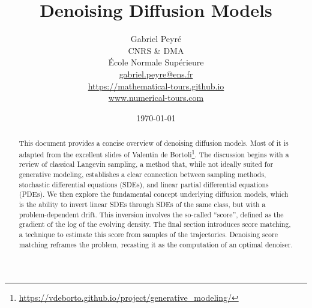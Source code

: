 \documentclass[10pt]{article}
\title{Denoising Diffusion Models}
\author{%
\begin{tabular}{c}
	Gabriel Peyr{\'e} \\ CNRS \& DMA \\
	 \'Ecole Normale Sup\'erieure \\
	 \url{gabriel.peyre@ens.fr}\\
	 \url{https://mathematical-tours.github.io}\\
	 \url{www.numerical-tours.com}
\end{tabular}
}
\date{\today}
\begin{document}
\maketitle

\begin{abstract}
This document provides a concise overview of denoising diffusion models. Most of it is adapted from the excellent slides of Valentin de Bortoli\footnote{\url{https://vdeborto.github.io/project/generative_modeling/}}. The discussion begins with a review of classical Langevin sampling, a method that, while not ideally suited for generative modeling, establishes a clear connection between sampling methods, stochastic differential equations (SDEs), and linear partial differential equations (PDEs). We then explore the fundamental concept underlying diffusion models, which is the ability to invert linear SDEs through SDEs of the same class, but with a problem-dependent drift. This inversion involves the so-called ``score'', defined as the gradient of the log of the evolving density. The final section introduces score matching, a technique to estimate this score from samples of the trajectories. Denoising score matching reframes the problem, recasting it as the computation of an optimal denoiser. 
\end{abstract}




\vspace{5mm}
 







\end{document}

